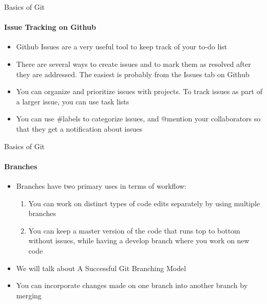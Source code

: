 \documentclass[10pt, aspectratio=169, xcolor=dvipsnames]{beamer}
\let\olditem\item
\renewcommand{\item}{%
\olditem\vspace{0.3em}}
\begin{document}
\begin{frame}[t]{Basics of Git}
    \framesubtitle{Issue Tracking on Github}

    \normalsize\vspace{0.5em}
    \begin{itemize}
        \item Github Issues are a very useful tool to keep track of your to-do list
        \item There are several ways to create issues and to mark them as resolved after they are addressed. The easiest is probably from the Issues tab on Github
        \item You can organize and prioritize issues with projects. To track issues as part of a larger issue, you can use task lists
        \item You can use \#labels to categorize issues, and @mention your collaborators so that they get a notification about issues
    \end{itemize}
\end{frame}

\begin{frame}[t]{Basics of Git}
    \framesubtitle{Branches}

    \normalsize\vspace{0.5em}
    \begin{itemize}
        \item \alert{Branches} have two primary uses in terms of workflow: 
        \begin{enumerate}
            \item You can work on distinct types of code edits separately by using multiple branches
            \item You can keep a \alert{master} version of the code that runs top to bottom without issues, while having a \alert{develop} branch where you work on new code
        \end{enumerate}
        \item We will talk about A Successful Git Branching Model
        \item You can incorporate changes made on one branch into another branch by \alert{merging}
    \end{itemize}
\end{frame}
\end{document}
